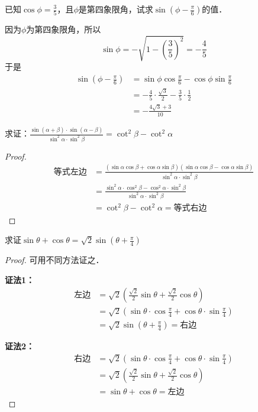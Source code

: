 \begin{example}
已知$\cos\phi=\frac{3}{5}$，且$\phi$是第四象限角，试求$\sin\left(\phi-\frac{\pi}{6}\right)$的值．
\end{example}

\begin{solution}
因为$\phi$为第四象限角，所以
\[\sin\phi=-\sqrt{1-\left(\frac{3}{5}\right)^2}=-\frac{4}{5}\]
于是
\[\begin{split}
    \sin\left(\phi-\frac{\pi}{6}\right)&=\sin\phi\cos\frac{\pi}{6}-\cos\phi\sin\frac{\pi}{6}\\
    &=-\frac{4}{5}\cdot \frac{\sqrt{3}}{2}-\frac{3}{5}\cdot\frac{1}{2}\\
    &=-\frac{4\sqrt{3}+3}{10}
\end{split}\]
\end{solution}

\begin{example}
    求证：$\frac{\sin(\alpha+\beta)\cdot \sin(\alpha-\beta)}{\sin^2\alpha\cdot \sin^2\beta}=\cot^2\beta-\cot^2\alpha$
\end{example}

\begin{proof}
\[\begin{split}
\text{等式左边}&=\frac{(\sin\alpha\cos\beta+\cos\alpha\sin\beta)(\sin\alpha\cos\beta-\cos\alpha\sin\beta)}{\sin^2\alpha\cdot \sin^2\beta}\\
&=\frac{\sin^2\alpha\cdot \cos^2\beta-\cos^2\alpha\cdot \sin^2\beta}{\sin^2\alpha\cdot \sin^2\beta}\\
&=\cot^2\beta-\cot^2\alpha=\text{等式右边}
\end{split}\]
\end{proof}

\begin{example}
求证$\sin\theta+\cos\theta=\sqrt{2}\sin\left(\theta+\frac{\pi}{4}\right)$
\end{example}

\begin{proof}
可用不同方法证之．

\textbf{证法1：}
\[\begin{split}
\text{左边}&=\sqrt{2}\left(\frac{\sqrt{2}}{2}\sin\theta+\frac{\sqrt{2}}{2}\cos\theta\right)\\
&=\sqrt{2}\left(\sin\theta\cdot \cos\frac{\pi}{4}+\cos\theta\cdot\sin\frac{\pi}{4}\right)\\
&=\sqrt{2}\sin\left(\theta+\frac{\pi}{4}\right)=\text{右边}    
\end{split}\]

\textbf{证法2：}
\[\begin{split}
\text{右边}&=\sqrt{2}\left(\sin\theta\cdot \cos\frac{\pi}{4}+\cos\theta\cdot\sin\frac{\pi}{4}\right)\\
&=\sqrt{2}\left(\frac{\sqrt{2}}{2}\sin\theta+\frac{\sqrt{2}}{2}\cos\theta\right)\\
&=\sin\theta+\cos\theta=\text{左边}
\end{split}\]
\end{proof}


